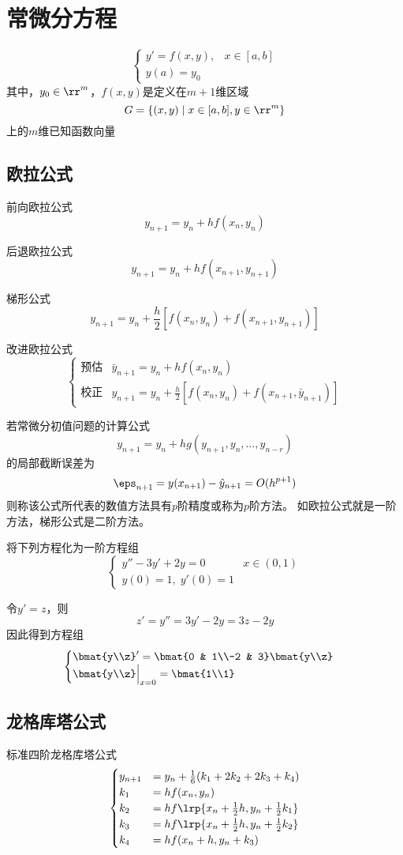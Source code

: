 
\section{常微分方程}
\[\begin{cases}
    y'=f(x,y),&x\in[a,b]\\
    y(a)=y_0
\end{cases}\]
其中，$y_0\in\rr^m$，$f(x,y)$是定义在$m+1$维区域
\[G=\{(x,y)\mid x\in[a,b],y\in\rr^m\}\]
上的$m$维已知函数向量

\subsection{欧拉公式}
前向欧拉公式
\[y_{n+1}=y_n+hf(x_n,y_n)\]

后退欧拉公式
\[y_{n+1}=y_n+hf(x_{n+1},y_{n+1})\]

梯形公式
\[y_{n+1}=y_n+\frac{h}{2}[f(x_n,y_n)+f(x_{n+1},y_{n+1})]\]

改进欧拉公式
\[\begin{cases}
    \text{预估} & \bar{y}_{n+1}=y_n+hf(x_n,y_n)\\
    \text{校正} & y_{n+1}=y_n+\frac{h}{2}[f(x_n,y_n)+f(x_{n+1},\bar{y}_{n+1})]
\end{cases}\]

\begin{theorem}
若常微分初值问题的计算公式
\[y_{n+1}=y_n+hg(y_{n+1},y_n,\ldots,y_{n-r})\]
的局部截断误差为
\[\eps_{n+1}=y(x_{n+1})-\hat{y}_{n+1}=O(h^{p+1})\]
则称该公式所代表的数值方法具有$p$阶精度或称为$p$阶方法。
如欧拉公式就是一阶方法，梯形公式是二阶方法。
\end{theorem}

\begin{example}
    将下列方程化为一阶方程组
    \[\begin{cases}
        y''-3y'+2y=0 & x\in(0,1)\\
        y(0)=1,\;y'(0)=1
    \end{cases}\]
\end{example}
\begin{analysis}
    令$y'=z$，则
    \[z'=y''=3y'-2y=3z-2y\]
    因此得到方程组
    \[\begin{cases}
        \bmat{y\\z}'=\bmat{0 & 1\\-2 & 3}\bmat{y\\z}\\
        \bmat{y\\z}\Big|_{x=0}=\bmat{1\\1}
    \end{cases}\]
\end{analysis}

\subsection{龙格库塔公式}
标准四阶龙格库塔公式
\[\begin{cases}
    y_{n+1}&=y_n+\frac{1}{6}(k_1+2k_2+2k_3+k_4)\\
    k_1&=hf(x_n,y_n)\\
    k_2&=hf\lrp{x_n+\frac{1}{2}h,y_n+\frac{1}{2}k_1}\\
    k_3&=hf\lrp{x_n+\frac{1}{2}h,y_n+\frac{1}{2}k_2}\\
    k_4&=hf(x_n+h,y_n+k_3)
\end{cases}\]
